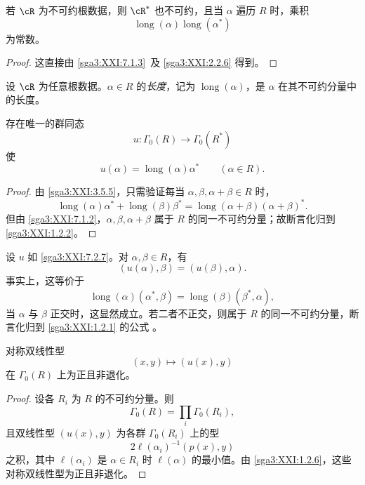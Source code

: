 \begin{lemma}\label{sga3:XXI:7.2.5}
若 \(\cR\) 为不可约根数据，则 \(\cR^\ast\) 也不可约，且当 \(\alpha\) 遍历 \(R\) 时，乘积
\[
 \operatorname{long}(\alpha)\operatorname{long}(\alpha^\ast)
\]
为常数。
\end{lemma}

\begin{proof}
这直接由 \ref{sga3:XXI:7.1.3}\, 及 \ref{sga3:XXI:2.2.6} 得到。
\end{proof}

\begin{definition}\label{sga3:XXI:7.2.6}
设 \(\cR\) 为任意根数据。\(\alpha\in R\) 的\emph{长度}，记为 \(\operatorname{long}(\alpha)\)，是 \(\alpha\) 在其不可约分量中的长度。
\end{definition}

\begin{lemma}\label{sga3:XXI:7.2.7}
存在唯一的群同态
\[
 u:\Gamma_0(R)\longrightarrow\Gamma_0(R^\ast)
\]
使
\[
 u(\alpha)=\operatorname{long}(\alpha)\alpha^\ast
 \qquad(\alpha\in R).
\]
\end{lemma}

\begin{proof}
由 \ref{sga3:XXI:3.5.5}，只需验证每当 \(\alpha,\beta,\alpha+\beta\in R\) 时，
\[
 \operatorname{long}(\alpha)\alpha^\ast+
 \operatorname{long}(\beta)\beta^\ast
 =
 \operatorname{long}(\alpha+\beta)(\alpha+\beta)^\ast.
\]
但由 \ref{sga3:XXI:7.1.2}，\(\alpha,\beta,\alpha+\beta\) 属于 \(R\) 的同一不可约分量；故断言化归到 \ref{sga3:XXI:1.2.2}。
\end{proof}

\begin{remark}\label{sga3:XXI:7.2.8}
设 \(u\) 如 \ref{sga3:XXI:7.2.7}。对 \(\alpha,\beta\in R\)，有
\[
 (u(\alpha),\beta)=(u(\beta),\alpha).
\]
事实上，这等价于
\[
 \operatorname{long}(\alpha)(\alpha^\ast,\beta)
 =
 \operatorname{long}(\beta)(\beta^\ast,\alpha),
\]
当 \(\alpha\) 与 \(\beta\) 正交时，这显然成立。若二者不正交，则属于 \(R\) 的同一不可约分量，断言化归到 \ref{sga3:XXI:1.2.1} 的公式 。
\end{remark}

\begin{remark}\label{sga3:XXI:7.2.9}
对称双线性型
\[
 (x,y)\longmapsto(u(x),y)
\]
在 \(\Gamma_0(R)\) 上为正且非退化。
\end{remark}

\begin{proof}
设各 \(R_i\) 为 \(R\) 的不可约分量。则
\[
 \Gamma_0(R)=\prod_i\Gamma_0(R_i),
\]
且双线性型 \((u(x),y)\) 为各群 \(\Gamma_0(R_i)\) 上的型
\[
 2\ell(\alpha_i)^{-1}(p(x),y)
\]
之积，其中 \(\ell(\alpha_i)\) 是 \(\alpha\in R_i\) 时 \(\ell(\alpha)\) 的最小值。由 \ref{sga3:XXI:1.2.6}，这些对称双线性型为正且非退化。
\end{proof}

